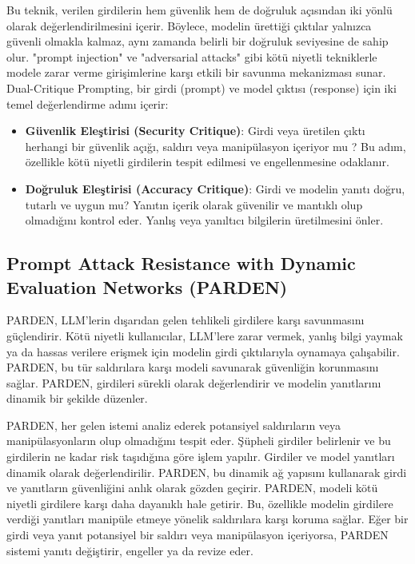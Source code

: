 Bu teknik, verilen girdilerin hem güvenlik hem de doğruluk açısından iki yönlü olarak değerlendirilmesini içerir. Böylece, modelin ürettiği çıktılar yalnızca güvenli olmakla kalmaz, aynı zamanda belirli bir doğruluk seviyesine de sahip olur. "prompt injection" ve "adversarial attacks" gibi kötü niyetli tekniklerle modele zarar verme girişimlerine karşı etkili bir savunma mekanizması sunar. Dual-Critique Prompting, bir girdi (prompt) ve model çıktısı (response) için iki temel değerlendirme adımı içerir:

\begin{itemize}
    \item \textbf{Güvenlik Eleştirisi (Security Critique)}: Girdi veya üretilen çıktı herhangi bir güvenlik açığı, saldırı veya manipülasyon içeriyor mu ? Bu adım, özellikle kötü niyetli girdilerin tespit edilmesi ve engellenmesine odaklanır.
    \item \textbf{Doğruluk Eleştirisi (Accuracy Critique)}: Girdi ve modelin yanıtı doğru, tutarlı ve uygun mu? Yanıtın içerik olarak güvenilir ve mantıklı olup olmadığını kontrol eder. Yanlış veya yanıltıcı bilgilerin üretilmesini önler.
\end{itemize}

\newpage

\subsection{Prompt Attack Resistance with Dynamic Evaluation Networks (PARDEN)}

PARDEN, LLM'lerin dışarıdan gelen tehlikeli girdilere karşı savunmasını güçlendirir. Kötü niyetli kullanıcılar, LLM'lere zarar vermek, yanlış bilgi yaymak ya da hassas verilere erişmek için modelin girdi çıktılarıyla oynamaya çalışabilir. PARDEN, bu tür saldırılara karşı modeli savunarak güvenliğin korunmasını sağlar. PARDEN, girdileri sürekli olarak değerlendirir ve modelin yanıtlarını dinamik bir şekilde düzenler.

PARDEN, her gelen istemi analiz ederek potansiyel saldırıların veya manipülasyonların olup olmadığını tespit eder. Şüpheli girdiler belirlenir ve bu girdilerin ne kadar risk taşıdığına göre işlem yapılır. Girdiler ve model yanıtları dinamik olarak değerlendirilir. PARDEN, bu dinamik ağ yapısını kullanarak girdi ve yanıtların güvenliğini anlık olarak gözden geçirir. PARDEN, modeli kötü niyetli girdilere karşı daha dayanıklı hale getirir. Bu, özellikle modelin girdilere verdiği yanıtları manipüle etmeye yönelik saldırılara karşı koruma sağlar. Eğer bir girdi veya yanıt potansiyel bir saldırı veya manipülasyon içeriyorsa, PARDEN sistemi yanıtı değiştirir, engeller ya da revize eder.

\newpage
